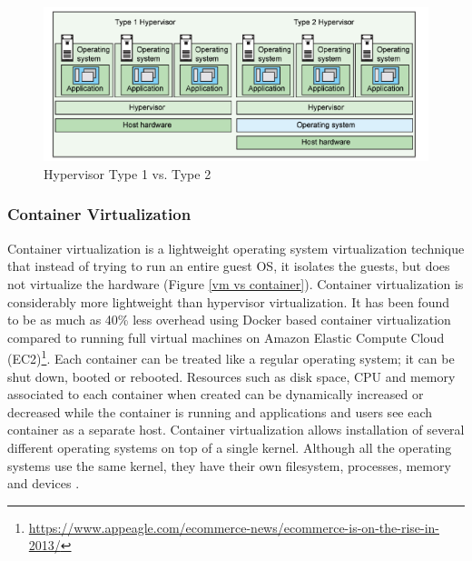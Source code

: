 \documentclass[a4paper,11pt,twoside]{report}
\begin{document}
\begin{figure}[!ht]
  \centering
     \includegraphics[scale=1]{Hypervisor}
  \caption{Hypervisor Type 1 vs. Type 2 \cite{Hypervisors}}
  \label{Hypervisor}
\end{figure}

\subsubsection*{Container Virtualization} 
Container virtualization is a lightweight operating system virtualization technique that instead of trying to run an entire guest OS, it isolates the guests, but does not virtualize the hardware  \cite{container} (Figure \ref{vm vs container}). Container virtualization is considerably more lightweight than hypervisor virtualization. It has been found to be as much as 40\% less overhead using Docker based container virtualization compared to running full virtual machines on Amazon Elastic Compute Cloud (EC2)\footnote{\url{https://www.appeagle.com/ecommerce-news/ecommerce-is-on-the-rise-in-2013/}}. Each container can be treated like a regular operating system; it can be shut down, booted or rebooted. Resources such as disk space, CPU and memory associated to each container when created can be dynamically increased or decreased while the container is running and applications and users see each container as a separate host. Container virtualization allows installation of several different operating systems on top of a single kernel. Although all the operating systems use the same kernel, they have their own filesystem, processes, memory and devices \cite{container}. \bigskip
\end{document}
